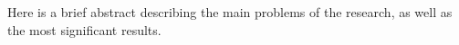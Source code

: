 Here is a brief abstract describing the main problems of the research, as well as the most significant results.